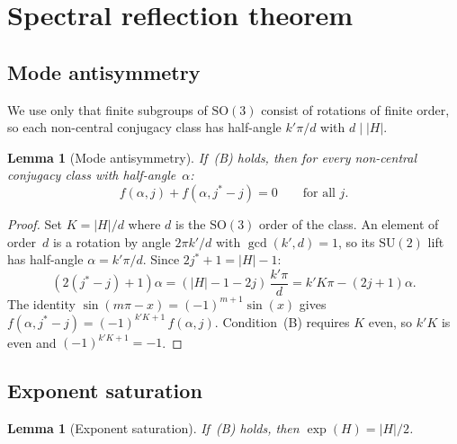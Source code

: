 \documentclass[12pt]{article}
\newtheorem{lemma}[theorem]{Lemma}
\theoremstyle{definition}
\theoremstyle{remark}
\newcommand{\SU}{\mathrm{SU}}
\newcommand{\SO}{\mathrm{SO}}
\begin{document}
\section{Spectral reflection theorem}
\label{sec:duality}

\subsection{Mode antisymmetry}
\label{sec:antisymmetry}

We use only that finite subgroups of $\SO(3)$ consist of
rotations of finite order, so each non-central conjugacy class
has half-angle $k'\pi/d$ with $d \mid |H|$.

\begin{lemma}[Mode antisymmetry]
  \label{lem:antisymmetry}
  If~\textup{(B)} holds, then for every non-central
  conjugacy class with half-angle~$\alpha$:
  \begin{equation}
    \label{eq:mode-antisymmetry}
    f(\alpha, j) + f(\alpha, j^*{-}j) = 0
    \qquad\text{for all } j.
  \end{equation}
\end{lemma}

\begin{proof}
  Set $K = |H|/d$ where $d$ is the $\SO(3)$ order
  of the class.
  An element of order~$d$
  is a rotation by angle $2\pi k'/d$ with
  $\gcd(k', d) = 1$, so its $\SU(2)$ lift has
  half-angle $\alpha = k'\pi/d$.
  Since $2j^*{+}1 = |H| - 1$:
  \[
    (2(j^*{-}j){+}1)\alpha
    = (|H|{-}1{-}2j)\,\frac{k'\pi}{d}
    = k'K\pi - (2j{+}1)\alpha.
  \]
  The identity
  $\sin(m\pi - x) = (-1)^{m+1}\sin(x)$ gives
  $f(\alpha, j^*{-}j) = (-1)^{k'K+1}\,f(\alpha, j)$.
  Condition~(B) requires $K$ even, so $k'K$ is even
  and $(-1)^{k'K+1} = -1$.
\end{proof}

\subsection{Exponent saturation}
\label{sec:exponent}

\begin{lemma}[Exponent saturation]
  \label{lem:exponent}
  If~\textup{(B)} holds, then $\exp(H) = |H|/2$.
\end{lemma}
\end{document}
